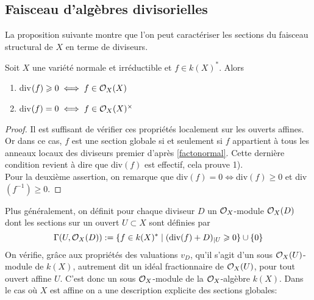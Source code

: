 \subsection{Faisceau d'algèbres divisorielles}

La proposition suivante montre que l'on peut caractériser les sections du faisceau structural de $X$ en terme de diviseurs.

\begin{prop}\label{caracfaisceaustructdiv}
Soit $X$ une variété normale et irréductible et $f\in k(X)^*$. Alors 
\begin{enumerate}
\item div$(f)\geqslant 0\iff f \in\mathcal{O}_X(X)$
\item div$(f)= 0\iff f\in\mathcal{O}_X(X)^\times$
\end{enumerate}
\end{prop}
\begin{proof}
Il est suffisant de vérifier ces propriétés localement sur les ouverts affines. Or dans ce cas, $f$ est une section globale si et seulement si $f$ appartient à tous les anneaux locaux des diviseurs premier d'après \ref{factonormal}. Cette dernière condition revient à dire que div$(f)$ est effectif, cela prouve 1).  \\
Pour la deuxième assertion, on remarque que div$(f)=0\iff$div$(f)\geq 0$ et div$(f^{-1})\geq 0$.
\end{proof}

Plus généralement, on définit pour chaque diviseur $D$ un $\mathcal{O}_X$-module $\mathcal{O}_X(D)$ dont les sections sur un ouvert $U\subset X$ sont définies par $$\Gamma(U,\mathcal{O}_X(D)):=\lbrace f\in k(X)^* \mid (\textrm{div}(f)+D)_{|U}\geqslant 0\rbrace\cup \lbrace 0 \rbrace$$
On vérifie, grâce aux propriétés des valuations $v_D$, qu'il s'agit d'un sous $\mathcal{O}_X(U)$-module de $k(X)$, autrement dit un idéal fractionnaire de $\mathcal{O}_X(U)$, pour tout ouvert affine $U$. C'est donc un sous $\mathcal{O}_X$-module de la  $\mathcal{O}_X$-algèbre $k(X)$. Dans le cas où $X$ est affine on a une description explicite des sections globales:

